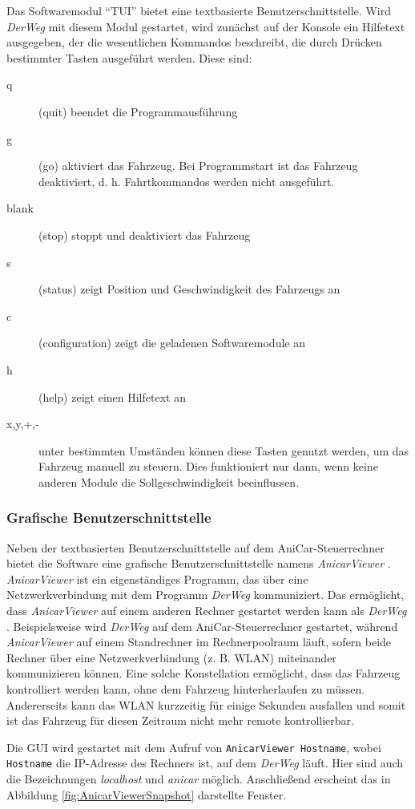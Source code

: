 \documentclass[a4paper, 11pt]{article}
\newcommand{\DerWeg}{\textit{DerWeg }}  %
\newcommand{\AnicarViewer}{\textit{AnicarViewer }}  %
\begin{document}
{Das Softwaremodul "`TUI"' bietet eine textbasierte Benutzerschnittstelle. Wird \DerWeg mit diesem Modul gestartet, wird zunächst auf der Konsole ein Hilfetext ausgegeben, der die wesentlichen Kommandos beschreibt, die durch Drücken bestimmter Tasten ausgeführt werden. Diese sind:
\begin{description}
\item[q] (quit) beendet die Programmausführung
\item[g] (go) aktiviert das Fahrzeug. Bei Programmstart ist das Fahrzeug deaktiviert, d. h. Fahrtkommandos werden nicht ausgeführt.
\item[blank] (stop) stoppt und deaktiviert das Fahrzeug
\item[s] (status) zeigt Position und Geschwindigkeit des Fahrzeugs an
\item[c] (configuration) zeigt die geladenen Softwaremodule an
\item[h] (help) zeigt einen Hilfetext an
\item[x,y,+,-] unter bestimmten Umständen können diese Tasten genutzt werden, um das Fahrzeug manuell zu steuern. Dies funktioniert nur dann, wenn keine anderen Module die Sollgeschwindigkeit beeinflussen.
\end{description}

\subsubsection{Grafische Benutzerschnittstelle}
\label{sec:gui}

Neben der textbasierten Benutzerschnittstelle auf dem AniCar-Steuerrechner bietet die Software eine grafische Benutzerschnittstelle namens \AnicarViewer. \AnicarViewer ist ein eigenständiges Programm, das über eine Netzwerkverbindung mit dem Programm \DerWeg kommuniziert. Das ermöglicht, dass \AnicarViewer auf einem anderen Rechner gestartet werden kann als \DerWeg. Beispielsweise wird \DerWeg auf dem AniCar-Steuerrechner gestartet, während \AnicarViewer auf einem Standrechner im Rechnerpoolraum läuft, sofern beide Rechner über eine Netzwerkverbindung (z. B. WLAN) miteinander kommunizieren können. Eine solche Konstellation ermöglicht, dass das Fahrzeug kontrolliert werden kann, ohne dem Fahrzeug hinterherlaufen zu müssen. Andererseits kann das WLAN kurzzeitig für einige Sekunden ausfallen und somit ist das Fahrzeug für diesen Zeitraum nicht mehr remote kontrollierbar.

Die GUI wird gestartet mit dem Aufruf von \texttt{AnicarViewer Hostname}, wobei \texttt{Hostname} die IP-Adresse des Rechners ist, auf dem \DerWeg läuft. Hier sind auch die Bezeichnungen \textit{localhost} und \textit{anicar} möglich. Anschließend erscheint das in Abbildung \ref{fig:AnicarViewerSnapshot} darstellte Fenster.

}
\end{document}
